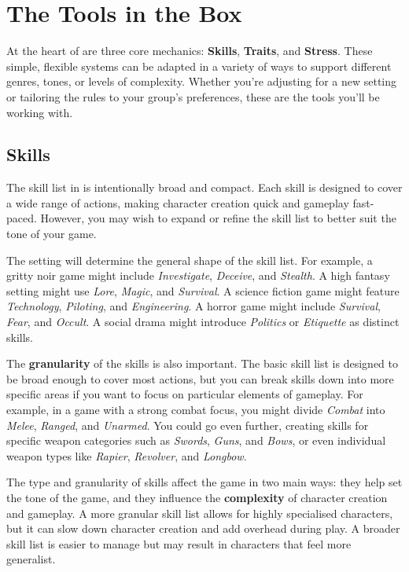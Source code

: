 
\section{The Tools in the Box}

At the heart of \wyrd are three core mechanics: \textbf{Skills}, \textbf{Traits}, and \textbf{Stress}. These simple, flexible systems can be adapted in a variety of ways to support different genres, tones, or levels of complexity. Whether you're adjusting for a new setting or tailoring the rules to your group's preferences, these are the tools you'll be working with.

\subsection{Skills}

The skill list in \wyrd is intentionally broad and compact. Each skill is designed to cover a wide range of actions, making character creation quick and gameplay fast-paced. However, you may wish to expand or refine the skill list to better suit the tone of your game.

The setting will determine the general shape of the skill list. For example, a gritty noir game might include \textit{Investigate}, \textit{Deceive}, and \textit{Stealth}. A high fantasy setting might use \textit{Lore}, \textit{Magic}, and \textit{Survival}. A science fiction game might feature \textit{Technology}, \textit{Piloting}, and \textit{Engineering}. A horror game might include \textit{Survival}, \textit{Fear}, and \textit{Occult}. A social drama might introduce \textit{Politics} or \textit{Etiquette} as distinct skills.

The \textbf{granularity} of the skills is also important. The basic skill list is designed to be broad enough to cover most actions, but you can break skills down into more specific areas if you want to focus on particular elements of gameplay. For example, in a game with a strong combat focus, you might divide \textit{Combat} into \textit{Melee}, \textit{Ranged}, and \textit{Unarmed}. You could go even further, creating skills for specific weapon categories such as \textit{Swords}, \textit{Guns}, and \textit{Bows}, or even individual weapon types like \textit{Rapier}, \textit{Revolver}, and \textit{Longbow}.

The type and granularity of skills affect the game in two main ways: they help set the tone of the game, and they influence the \textbf{complexity} of character creation and gameplay. A more granular skill list allows for highly specialised characters, but it can slow down character creation and add overhead during play. A broader skill list is easier to manage but may result in characters that feel more generalist.

